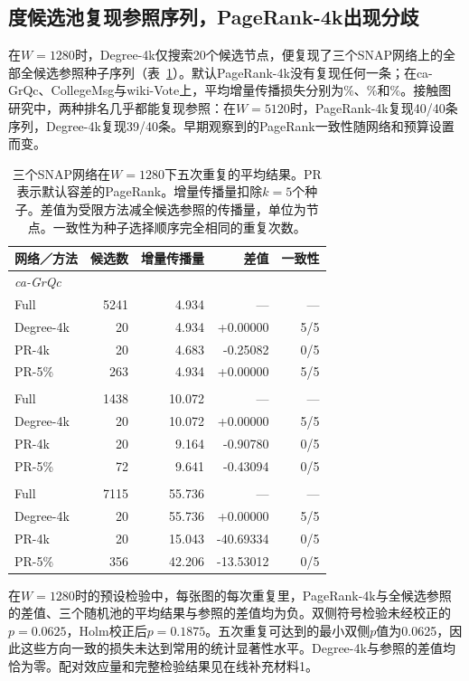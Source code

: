 \documentclass[smallextended]{svjour3}
\begin{document}
\subsection{度候选池复现参照序列，PageRank-4k出现分歧}
在$W=1280$时，Degree-4k仅搜索20个候选节点，便复现了三个SNAP网络上的全部全候选参照种子序列（表~\ref{tab:primary}）。默认PageRank-4k没有复现任何一条；在ca-GrQc、CollegeMsg与wiki-Vote上，平均增量传播损失分别为\GrqcPRLoss{}\%、\CollegePRLoss{}\%和\WikiPRLoss{}\%。接触图研究中，两种排名几乎都能复现参照：在$W=5120$时，PageRank-4k复现40/40条序列，Degree-4k复现39/40条。早期观察到的PageRank一致性随网络和预算设置而变。

\begin{table}[htbp]
\caption{三个SNAP网络在$W=1280$下五次重复的平均结果。PR表示默认容差的PageRank。增量传播量扣除$k=5$个种子。差值为受限方法减全候选参照的传播量，单位为节点。一致性为种子选择顺序完全相同的重复次数。}\label{tab:primary}
\centering\begin{tabular}{lrrrr}\toprule
网络／方法 & 候选数 & 增量传播量 & 差值 & 一致性 \\ \midrule
\multicolumn{5}{l}{\textit{ca-GrQc}} \\
Full & 5241 & 4.934 & --- & --- \\
Degree-4k & 20 & 4.934 & +0.00000 & 5/5 \\
PR-4k & 20 & 4.683 & -0.25082 & 0/5 \\
PR-5\% & 263 & 4.934 & +0.00000 & 5/5 \\
\addlinespace
\multicolumn{5}{l}{\textit{CollegeMsg}} \\
Full & 1438 & 10.072 & --- & --- \\
Degree-4k & 20 & 10.072 & +0.00000 & 5/5 \\
PR-4k & 20 & 9.164 & -0.90780 & 0/5 \\
PR-5\% & 72 & 9.641 & -0.43094 & 0/5 \\
\addlinespace
\multicolumn{5}{l}{\textit{wiki-Vote}} \\
Full & 7115 & 55.736 & --- & --- \\
Degree-4k & 20 & 55.736 & +0.00000 & 5/5 \\
PR-4k & 20 & 15.043 & -40.69334 & 0/5 \\
PR-5\% & 356 & 42.206 & -13.53012 & 0/5 \\
\bottomrule\end{tabular}
\end{table}

在$W=1280$时的预设检验中，每张图的每次重复里，PageRank-4k与全候选参照的差值、三个随机池的平均结果与参照的差值均为负。双侧符号检验未经校正的$p=0.0625$，Holm校正后$p=0.1875$。五次重复可达到的最小双侧$p$值为0.0625，因此这些方向一致的损失未达到常用的统计显著性水平。Degree-4k与参照的差值均恰为零。配对效应量和完整检验结果见在线补充材料1。
\end{document}
